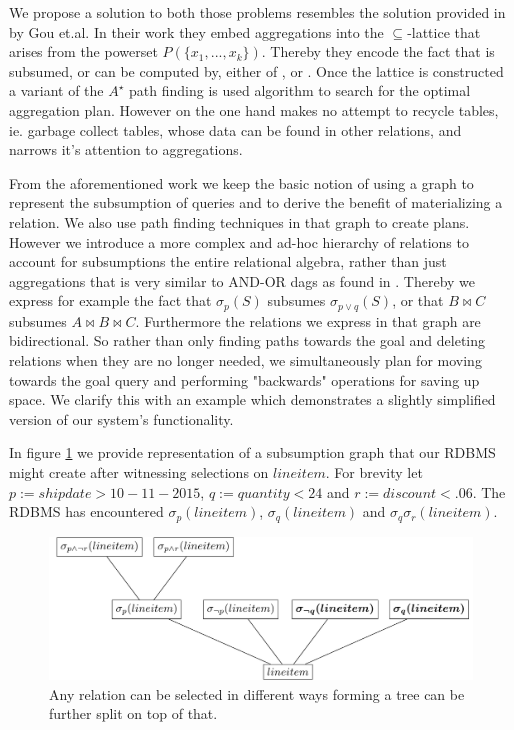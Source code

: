 We propose a solution to both those problems resembles the solution
provided in \cite{gouSupSearchEfficient2006} by Gou et.al. In their work
they embed aggregations  into the
\(\subseteq\)-lattice that arises from the powerset \(P(\{x_1, ...,
x_k\})\). Thereby they encode the fact that  is
subsumed, or can be computed by, either of ,  or . Once the lattice is constructed a variant of
the \(A^{\star}\) path finding is used algorithm to search for the
optimal aggregation plan. However \cite{gouSupSearchEfficient2006} on
the one hand makes no attempt to recycle tables, ie. garbage collect
tables, whose data can be found in other relations, and narrows it's
attention to aggregations.

From the aforementioned work we keep the basic notion of using a graph
to represent the subsumption of queries and to derive the benefit of
materializing a relation. We also use path finding techniques in that
graph to create plans. However we introduce a more complex and ad-hoc
hierarchy of relations to account for subsumptions the entire
relational algebra, rather than just aggregations that is very similar
to AND-OR dags as found in
\cite{mistryMaterializedViewSelection2001}. Thereby we express for
example the fact that \(\sigma_p(S)\) subsumes \(\sigma_{p \lor q}(S)\),
or that \(B \Join C\) subsumes \(A \Join B \Join C\). Furthermore the
relations we express in that graph are bidirectional. So rather than
only finding paths towards the goal and deleting relations when they
are no longer needed, we simultaneously plan for moving towards the
goal query and performing "backwards" operations for saving up
space. We clarify this with an example which demonstrates a slightly
simplified version of our system's functionality.

In figure \ref{fig:intro_selectexample} we provide representation of a subsumption
graph that our RDBMS might create after witnessing selections on
\(lineitem\). For brevity let \(p:=shipdate > 10-11-2015\),
\(q:=quantity < 24\) and \(r:=discount < .06\). The RDBMS has
encountered \(\sigma_{p}(lineitem)\), \(\sigma_{q}(lineitem)\) and
\(\sigma_{q} \sigma_{r} (lineitem)\).

\begin{figure}[H]
  \centering
  \includegraphics[width=.9\linewidth]{./imgs/intro_selectexample.pdf}
  \caption{\label{fig:intro_selectexample}Any relation can be selected
    in different ways forming a tree can be further split on top of
    that.}
\end{figure}

